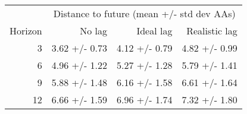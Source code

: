 
\begin{tabular*}{0.7\textwidth}{rrrr}
\toprule
          & \multicolumn{3}{c}{Distance to future (mean +/- std dev AAs)} \\
  Horizon & No lag & Ideal lag & Realistic lag \\
\midrule

3 & 3.62 +/- 0.73 & 4.12 +/- 0.79 & 4.82 +/- 0.99 \\
6 & 4.96 +/- 1.22 & 5.27 +/- 1.28 & 5.79 +/- 1.41 \\
9 & 5.88 +/- 1.48 & 6.16 +/- 1.58 & 6.61 +/- 1.64 \\
12 & 6.66 +/- 1.59 & 6.96 +/- 1.74 & 7.32 +/- 1.80 \\

\bottomrule
\end{tabular*}

